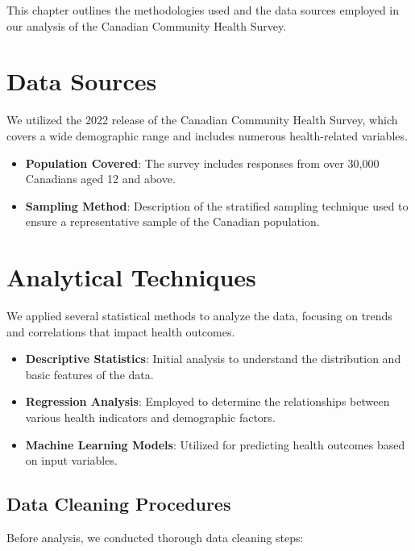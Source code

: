 \documentclass[
]{book}
\providecommand{\tightlist}{%
  \setlength{\itemsep}{0pt}\setlength{\parskip}{0pt}}
\begin{document}
This chapter outlines the methodologies used and the data sources employed in our analysis of the Canadian Community Health Survey.

\section{Data Sources}\label{data-sources}

We utilized the 2022 release of the Canadian Community Health Survey, which covers a wide demographic range and includes numerous health-related variables.

\begin{itemize}
\tightlist
\item
  \textbf{Population Covered}: The survey includes responses from over 30,000 Canadians aged 12 and above.
\item
  \textbf{Sampling Method}: Description of the stratified sampling technique used to ensure a representative sample of the Canadian population.
\end{itemize}

\section{Analytical Techniques}\label{analytical-techniques}

We applied several statistical methods to analyze the data, focusing on trends and correlations that impact health outcomes.

\begin{itemize}
\tightlist
\item
  \textbf{Descriptive Statistics}: Initial analysis to understand the distribution and basic features of the data.
\item
  \textbf{Regression Analysis}: Employed to determine the relationships between various health indicators and demographic factors.
\item
  \textbf{Machine Learning Models}: Utilized for predicting health outcomes based on input variables.
\end{itemize}

\subsection*{Data Cleaning Procedures}\label{data-cleaning-procedures}

Before analysis, we conducted thorough data cleaning steps:
\end{document}
